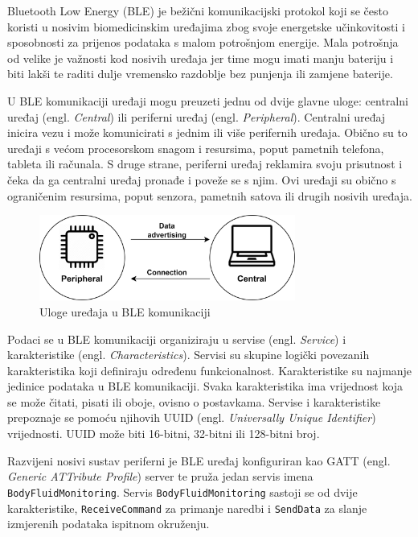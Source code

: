 \documentclass[../diplomski_rad.tex]{subfiles}
\begin{document}
Bluetooth Low Energy (BLE) je bežični komunikacijski protokol koji se često koristi u 
nosivim biomedicinskim uređajima zbog svoje energetske učinkovitosti i sposobnosti za prijenos podataka s malom potrošnjom energije.
Mala potrošnja od velike je važnosti kod nosivih uređaja jer time mogu imati manju bateriju i biti lakši te raditi dulje vremensko razdoblje 
bez punjenja ili zamjene baterije. 

U BLE komunikaciji uređaji mogu preuzeti jednu od dvije glavne uloge:
centralni uređaj (engl. \textit{Central}) ili periferni uređaj (engl. \textit{Peripheral}). 
Centralni uređaj inicira vezu i može komunicirati s jednim ili više perifernih uređaja. 
Obično su to uređaji s većom procesorskom snagom i resursima, poput pametnih telefona, tableta ili računala. 
S druge strane, periferni uređaj reklamira svoju prisutnost i čeka da ga centralni uređaj 
pronađe i poveže se s njim. Ovi uređaji su obično s ograničenim resursima, 
poput senzora, pametnih satova ili drugih nosivih uređaja.

\begin{figure}[htb]
    \centering
    \includegraphics[width=0.75\textwidth]{Figures/ble_role.png} 
    \caption{Uloge uređaja u BLE komunikaciji}
    \label{slk:max_30009_clock}
\end{figure}

Podaci se u BLE komunikaciji organiziraju u servise (engl. \textit{Service}) i karakteristike (engl. \textit{Characteristics}).
Servisi su skupine logički povezanih karakteristika koji definiraju određenu funkcionalnost. 
Karakteristike su najmanje jedinice podataka u BLE komunikaciji. 
Svaka karakteristika ima vrijednost koja se može čitati, pisati ili oboje, ovisno o postavkama. 
Servise i karakteristike prepoznaje se pomoću njihovih UUID (engl. \textit{Universally Unique Identifier}) vrijednosti. 
UUID može biti 16-bitni, 32-bitni ili 128-bitni broj.

Razvijeni nosivi sustav periferni je BLE uređaj konfiguriran kao GATT (engl. \textit{Generic ATTribute Profile}) server 
te pruža jedan servis imena \texttt{BodyFluidMonitoring}. 
Servis \texttt{BodyFluidMonitoring} sastoji se od dvije karakteristike, \texttt{ReceiveCommand} za primanje naredbi i 
\texttt{SendData} za slanje izmjerenih podataka ispitnom okruženju.
\end{document}
